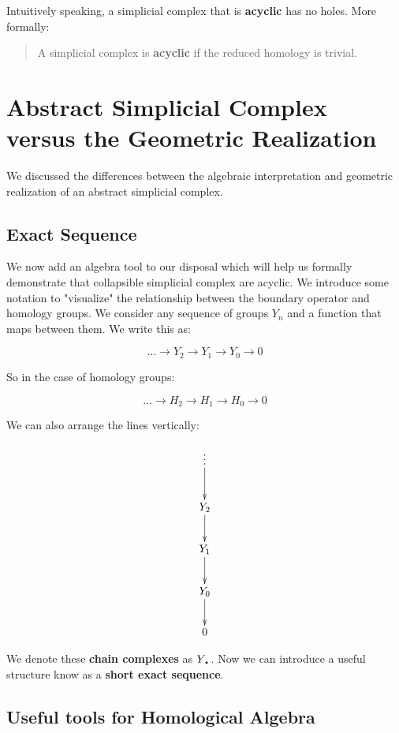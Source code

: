 \documentclass[letterpaper,12pt]{article}
\newcommand{\tb}{\text{\textbullet}}
\begin{document}
Intuitively speaking, a simplicial complex that is \textbf{acyclic} has no holes. More formally:

\begin{quote}
    A simplicial complex is \textbf{acyclic} if the reduced homology is trivial.
\end{quote}

\section{Abstract Simplicial Complex versus the Geometric Realization}

We discussed the differences between the algebraic interpretation and geometric realization of an abstract simplicial complex. 


\subsection{Exact Sequence}

We now add an algebra tool to our disposal which will help us formally demonstrate that collapsible simplicial complex are acyclic. We introduce some notation to "visualize" the relationship between the boundary operator and homology groups. We consider any sequence of groups $Y_n$ and a function that maps between them. We write this as:

$$\ldots \longrightarrow Y_2 \rightarrow Y_1 \rightarrow Y_0 \rightarrow 0 $$

So in the case of homology groups:

$$\ldots \rightarrow H_2 \rightarrow H_1 \rightarrow H_0 \rightarrow 0 $$

We can also arrange the lines vertically:

\begin{displaymath}
    \xymatrix{\vdots \ar[d] \\ Y_2 \ar[d] \\ Y_1 \ar[d] \\ Y_0 \ar[d] \\ 0 }
\end{displaymath}

We denote these \textbf{chain complexes} as $Y_{\tb}$. Now we can introduce a useful structure know as a \textbf{short exact sequence}.

\subsection{Useful tools for Homological Algebra}
\end{document}
